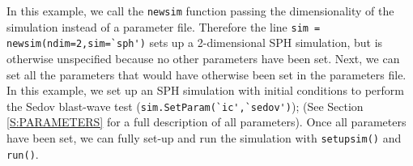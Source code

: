 \documentclass[a4paper]{article}
\newcommand{\var}[1]{\texttt{#1}}
\begin{document}





\noindent In this example, we call the \var{newsim} function passing the dimensionality of the simulation instead of a parameter file.  Therefore the line \lstinline{sim = newsim(ndim=2,sim=`sph')} sets up a 2-dimensional SPH simulation, but is otherwise unspecified because no other parameters have been set.  Next, we can set all the parameters that would have otherwise been set in the parameters file.  In this example, we set up an SPH simulation with initial conditions to perform the Sedov blast-wave test (\lstinline{sim.SetParam(`ic',`sedov')}); (See Section \ref{S:PARAMETERS} for a full description of all parameters).  Once all parameters have been set, we can fully set-up and run the simulation with \lstinline{setupsim()} and \lstinline{run()}.
\newpage


\end{document}
